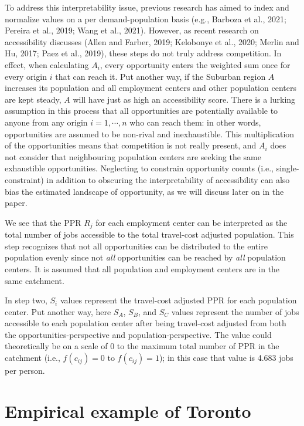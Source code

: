 \documentclass[]{elsarticle} %
\begin{document}
To address this interpretability issue, previous research has aimed to
index and normalize values on a per demand-population basis (e.g.,
Barboza et al., 2021; Pereira et al., 2019; Wang et al., 2021). However,
as recent research on accessibility discusses (Allen and Farber, 2019;
Kelobonye et al., 2020; Merlin and Hu, 2017; Paez et al., 2019), these
steps do not truly address competition. In effect, when calculating
\(A_i\), every opportunity enters the weighted sum once for every origin
\(i\) that can reach it. Put another way, if the Suburban region \(A\)
increases its population and all employment centers and other population
centers are kept steady, \(A\) will have just as high an accessibility
score. There is a lurking assumption in this process that all
opportunities are potentially available to anyone from any origin
\(i=1,\cdots,n\) who can reach them: in other words, opportunities are
assumed to be non-rival and inexhaustible. This multiplication of the
opportunities means that competition is not really present, and \(A_i\)
does not consider that neighbouring population centers are seeking the
same exhaustible opportunities. Neglecting to constrain opportunity
counts (i.e., single-constraint) in addition to obscuring the
interpretability of accessibility can also bias the estimated landscape
of opportunity, as we will discuss later on in the paper.

We see that the PPR \(R_{j}\) for each employment center can be
interpreted as the total number of jobs accessible to the total
travel-cost adjusted population. This step recognizes that not all
opportunities can be distributed to the entire population evenly since
not \emph{all} opportunities can be reached by \emph{all} population
centers. It is assumed that all population and employment centers are in
the same catchment.

In step two, \(S_{i}\) values represent the travel-cost adjusted PPR for
each population center. Put another way, here \(S_{A}\), \(S_{B}\), and
\(S_{C}\) values represent the number of jobs accessible to each
population center after being travel-cost adjusted from both the
opportunities-perspective and population-perspective. The value could
theoretically be on a scale of 0 to the maximum total number of PPR in
the catchment (i.e., \(f(c_{ij})=0\) to \(f(c_{ij})=1\)); in this case
that value is 4.683 jobs per person.

\hypertarget{empirical-example-of-toronto}{%
\section{Empirical example of
Toronto}\label{empirical-example-of-toronto}}
\end{document}
